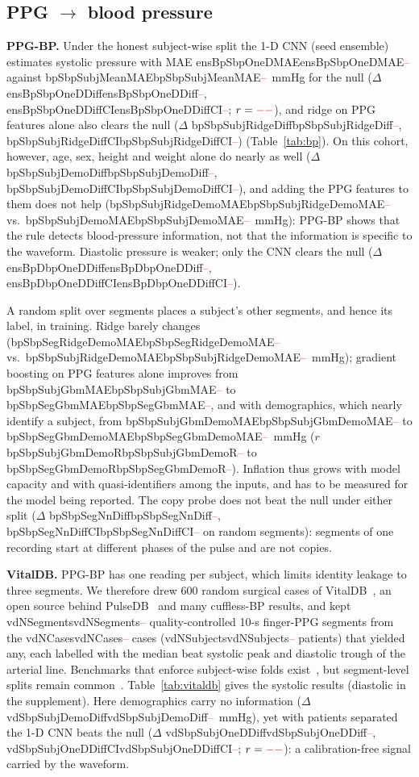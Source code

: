 \documentclass[journal]{IEEEtran}
\newcommand{\m}[1]{\ifcsname #1\endcsname\csname #1\endcsname\else\textcolor{red}{--}\fi}
\begin{document}
\subsection{PPG $\to$ blood pressure}
\label{sec:bp}
\textbf{PPG-BP.}  Under the honest subject-wise split the 1-D CNN (seed
ensemble) estimates systolic pressure with MAE \m{ensBpSbpOneDMAE} against
\m{bpSbpSubjMeanMAE}~mmHg for the null ($\Delta$ \m{ensBpSbpOneDDiff},
\m{ensBpSbpOneDDiffCI}; $r=\m{bpSbpSubjOneDR}$), and ridge on PPG features alone
also clears the null ($\Delta$ \m{bpSbpSubjRidgeDiff}, \m{bpSbpSubjRidgeDiffCI})
(Table~\ref{tab:bp}).  On this cohort, however, age, sex, height and weight
alone do nearly as well ($\Delta$ \m{bpSbpSubjDemoDiff}, \m{bpSbpSubjDemoDiffCI}), and
adding the PPG features to them does not help (\m{bpSbpSubjRidgeDemoMAE} vs.\
\m{bpSbpSubjDemoMAE}~mmHg): PPG-BP shows that the rule detects
blood-pressure information, not that the information is specific to the
waveform.  Diastolic pressure is weaker; only the CNN clears the null
($\Delta$ \m{ensBpDbpOneDDiff}, \m{ensBpDbpOneDDiffCI}).

A random split over segments places a subject's other segments, and hence
its label, in training.  Ridge barely changes
(\m{bpSbpSegRidgeDemoMAE} vs.\ \m{bpSbpSubjRidgeDemoMAE}~mmHg); gradient boosting
on PPG features alone improves from \m{bpSbpSubjGbmMAE} to \m{bpSbpSegGbmMAE},
and with demographics, which nearly identify a subject, from
\m{bpSbpSubjGbmDemoMAE} to \m{bpSbpSegGbmDemoMAE}~mmHg ($r$ \m{bpSbpSubjGbmDemoR}
to \m{bpSbpSegGbmDemoR}).  Inflation thus grows with model capacity and with
quasi-identifiers among the inputs, and has to be measured for the model
being reported.  The copy probe does not beat the null under either split
($\Delta$ \m{bpSbpSegNnDiff}, \m{bpSbpSegNnDiffCI} on random segments): segments
of one recording start at different phases of the pulse and are not copies.

\textbf{VitalDB.}  PPG-BP has one reading per subject, which limits identity
leakage to three segments.  We therefore drew 600 random surgical cases of
VitalDB~\cite{lee2022vitaldb}, an open source behind PulseDB~\cite{wang2023pulsedb}
and many cuffless-BP results, and kept \m{vdNSegments} quality-controlled 10-s
finger-PPG segments from the \m{vdNCases} cases (\m{vdNSubjects} patients)
that yielded any, each labelled with the median beat systolic peak and
diastolic trough of the arterial line.  Benchmarks that enforce subject-wise
folds exist~\cite{gonzalez2023bpbench}, but segment-level splits remain
common~\cite{yoshizawa2023}.  Table~\ref{tab:vitaldb} gives the systolic
results (diastolic in the supplement).  Here demographics carry no
information ($\Delta$ \m{vdSbpSubjDemoDiff}~mmHg), yet with patients separated
the 1-D CNN beats the null ($\Delta$ \m{vdSbpSubjOneDDiff}, \m{vdSbpSubjOneDDiffCI};
$r=\m{vdSbpSubjOneDR}$): a calibration-free signal carried by the waveform.
\end{document}
